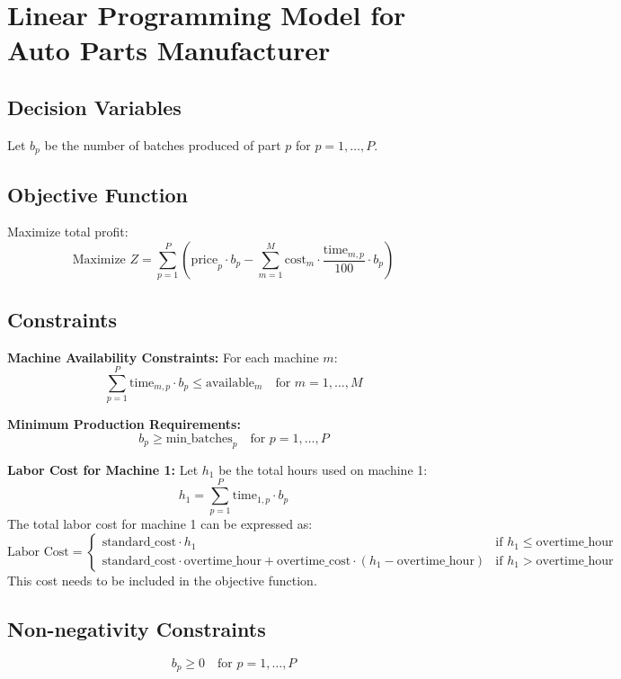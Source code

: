\documentclass{article}
\begin{document}
\section*{Linear Programming Model for Auto Parts Manufacturer}

\subsection*{Decision Variables}
Let \( b_p \) be the number of batches produced of part \( p \) for \( p = 1, \ldots, P \).

\subsection*{Objective Function}
Maximize total profit:
\[
\text{Maximize } Z = \sum_{p=1}^{P} \left( \text{price}_p \cdot b_p - \sum_{m=1}^{M} \text{cost}_m \cdot \frac{\text{time}_{m,p}}{100} \cdot b_p \right)
\]

\subsection*{Constraints}

\textbf{Machine Availability Constraints:}
For each machine \( m \):
\[
\sum_{p=1}^{P} \text{time}_{m,p} \cdot b_p \leq \text{available}_m \quad \text{for } m = 1, \ldots, M
\]

\textbf{Minimum Production Requirements:}
\[
b_p \geq \text{min\_batches}_p \quad \text{for } p = 1, \ldots, P
\]

\textbf{Labor Cost for Machine 1:}
Let \( h_{1} \) be the total hours used on machine 1:
\[
h_1 = \sum_{p=1}^{P} \text{time}_{1,p} \cdot b_p
\]
The total labor cost for machine 1 can be expressed as:
\[
\text{Labor Cost} = 
\begin{cases} 
\text{standard\_cost} \cdot h_1 & \text{if } h_1 \leq \text{overtime\_hour} \\
\text{standard\_cost} \cdot \text{overtime\_hour} + \text{overtime\_cost} \cdot (h_1 - \text{overtime\_hour}) & \text{if } h_1 > \text{overtime\_hour}
\end{cases}
\]
This cost needs to be included in the objective function.

\subsection*{Non-negativity Constraints}
\[
b_p \geq 0 \quad \text{for } p = 1, \ldots, P
\]
\end{document}
